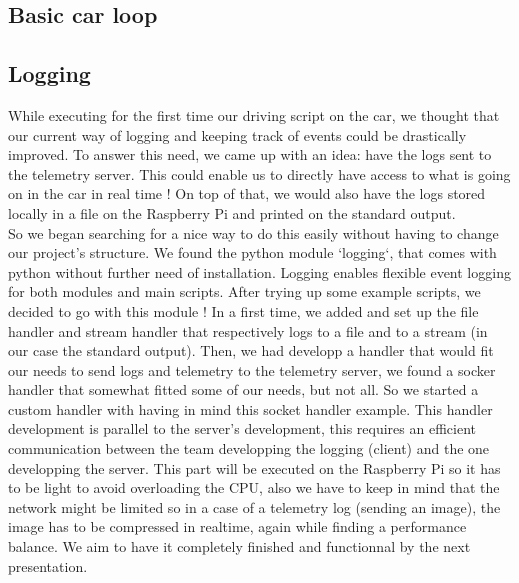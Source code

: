 \documentclass[12pt]{article}
\begin{document}
\subsection{Basic car loop}

\subsection{Logging}
While executing for the first time our driving script on the car, we thought that our current way of logging and keeping track of events could be drastically improved. To answer this need, we came up with an idea: have the logs sent to the telemetry server. This could enable us to directly have access to what is going on in the car in real time ! On top of that, we would also have the logs stored locally in a file on the Raspberry Pi and printed on the standard output. \\ 

So we began searching for a nice way to do this easily without having to change our project's structure. We found the python module `logging`, that comes with python without further need of installation. Logging enables flexible event logging for both modules and main scripts. After trying up some example scripts, we decided to go with this module ! In a first time, we added and set up the file handler and stream handler that respectively logs to a file and to a stream (in our case the standard output). Then, we had developp a handler that would fit our needs to send logs and telemetry to the telemetry server, we found a socker handler that somewhat fitted some of our needs, but not all. So we started a custom handler with having in mind this socket handler example. This handler development is parallel to the server's development, this requires an efficient communication between the team developping the logging (client) and the one developping the server. This part will be executed on the Raspberry Pi so it has to be light to avoid overloading the CPU, also we have to keep in mind that the network might be limited so in a case of a telemetry log (sending an image), the image has to be compressed in realtime, again while finding a performance balance. We aim to have it completely finished and functionnal by the next presentation.

\end{document}
